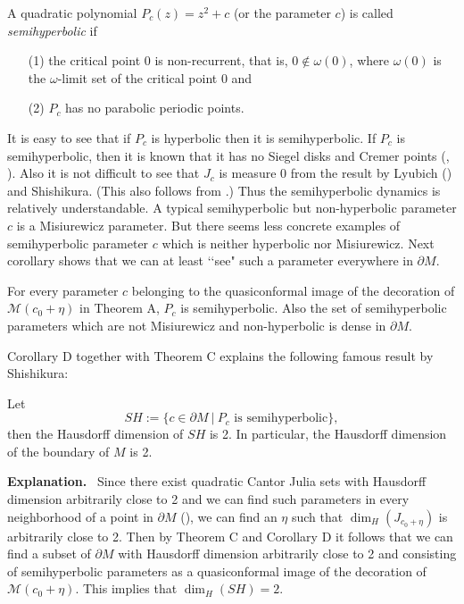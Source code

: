 \begin{defn}[\bf Semihyperbolicity]
A quadratic polynomial $P_c(z) = z^2 + c$ (or the parameter $c$) is 
called {\it semihyperbolic} if  
\begin{itemize}
\item[(1)]  the critical point $0$ is non-recurrent, that is, 
$0 \notin \omega(0)$, where $\omega(0)$ is the $\omega$-limit set of 
the critical point $0$ and

\item[(2)] $P_c$ has no parabolic periodic points.
\end{itemize}
\end{defn}




\noin
It is easy to see that if $P_c$ is hyperbolic then it is semihyperbolic.
If $P_c$ is semihyperbolic, then it is known that it has no Siegel
disks and Cremer points 
(\cite{Mane 1993}, \cite{Carleson-Jones-Yoccoz 1994}). Also it is not 
difficult to see that $J_c$ is measure 0 from the result by Lyubich 
(\cite{Lyubich 1991}) and Shishikura. (This also follows from 
\cite[p.2, Theorem 1.1]{Carleson-Jones-Yoccoz 1994}.) Thus the 
semihyperbolic dynamics is relatively understandable. A typical 
semihyperbolic but non-hyperbolic parameter $c$ is a Misiurewicz 
parameter. But there seems less concrete examples of semihyperbolic
parameter $c$ which is neither hyperbolic nor Misiurewicz. Next 
corollary shows that we can at least \lq\lq see" such a parameter 
everywhere in $\partial M$.




\begin{corD*}
For every parameter $c$ belonging to the quasiconformal image
of the decoration of ${\mathcal M}(c_0+\eta)$ in Theorem A, 
$P_c$ is semihyperbolic. Also the set of semihyperbolic parameters which 
are not Misiurewicz and non-hyperbolic is dense in $\partial M$. 
\end{corD*}


\noindent
Corollary D together with Theorem C explains the following famous result
by Shishikura:


\begin{thm*}[Shishikura, 1998]
Let
$$
  SH := \{ c \in \partial M \ | \ P_c \text{ is semihyperbolic} \},
$$
then the Hausdorff dimension of $SH$ is 2. In particular, the Hausdorff
dimension of the boundary of $M$ is 2.
\end{thm*}

\noin
{\bf Explanation.} \ 
Since there exist quadratic Cantor Julia sets with Hausdorff dimension
arbitrarily close to 2 and we can find such parameters in every 
neighborhood of a point in $\partial M$ 
(\cite[p.231, {\it proof of Theorem B} and p.232, {\it Remark} 1.1 (iii)]{Shishikura 1998}), we can find an 
$\eta$ such that $\dim_H(J_{c_0+\eta})$ is
arbitrarily close to 2. Then by Theorem C and Corollary D it follows that
we can find a subset of $\partial M$ with Hausdorff dimension
arbitrarily close to 2 and consisting of semihyperbolic parameters 
as a quasiconformal image of the decoration of ${\mathcal M}(c_0+\eta)$.
This implies that $\dim_H(SH) = 2$. 
\QED




